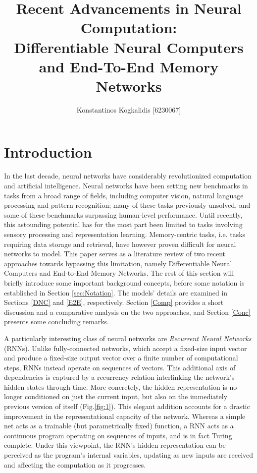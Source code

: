 \documentclass[]{article}
\begin{document}
\author{Konstantinos Kogkalidis [6230067]}
\title{Recent Advancements in Neural Computation: \\
\large Differentiable Neural Computers and End-To-End Memory Networks}
\maketitle

\section{Introduction}
In the last decade, neural networks have considerably revolutionized computation and artificial intelligence. Neural networks have been setting new benchmarks in tasks from a broad range of fields, including computer vision, natural language processing and pattern recognition; many of these tasks previously unsolved, and some of these benchmarks surpassing human-level performance. Until recently, this astounding potential has for the most part been limited to tasks involving sensory processing and representation learning. Memory-centric tasks, i.e. tasks requiring data storage and retrieval, have however proven difficult for neural networks to model. This paper serves as a literature review of two recent approaches towards bypassing this limitation, namely Differentiable Neural Computers\cite{Graves2016} and End-to-End Memory Networks\cite{NIPS2015_5846}. The rest of this section will briefly introduce some important background concepts, before some notation is established in Section \ref{sec:Notation}. The models' details are examined in Sections \ref{DNC} and \ref{E2E}, respectively. Section \ref{Comp} provides a short discussion and a comparative analysis on the two approaches, and Section \ref{Conc} presents some concluding remarks.

A particularly interesting class of neural networks are \textit{Recurrent Neural Networks} (RNNs). Unlike fully-connected networks, which accept a fixed-size input vector and produce a fixed-size output vector over a finite number of computational steps, RNNs instead operate on sequences of vectors. This additional axis of dependencies is captured by a recurrency relation interlinking the network's hidden states through time. More concretely, the hidden representation is no longer conditioned on just the current input, but also on the immediately previous version of itself (Fig.\ref{fig:1}). This elegant addition accounts for a drastic improvement in the representational capacity of the network. Whereas a simple net acts as a trainable (but parametrically fixed) function, a RNN acts as a continuous program operating on sequences of inputs, and is in fact Turing complete\cite{Siegelmann545}. Under this viewpoint, the RNN's hidden representation can be perceived as the program's internal variables, updating as new inputs are received and affecting the computation as it progresses.
\end{document}
